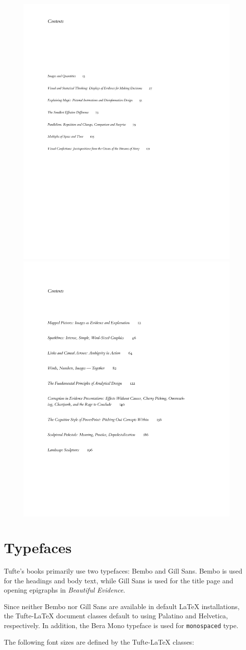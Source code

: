\documentclass[
  twoside,
  symmetric]{tufte-book}
\newcommand{\BE}{\textit{Beautiful Evidence}\xspace}
\newcommand{\TL}{Tufte-\LaTeX\xspace}
\begin{document}
\begin{figure}
\includegraphics[width=0.45\linewidth,height=\textheight,keepaspectratio]{style-guide/graphics/ve-contents.pdf}
\includegraphics[width=0.45\linewidth,height=\textheight,keepaspectratio]{style-guide/graphics/be-contents.pdf}

\end{figure}%

\section{Typefaces}\label{sec:typefaces1}

Tufte's books primarily use two typefaces: Bembo and Gill Sans. Bembo is
used for the headings and body text, while Gill Sans is used for the
title page and opening epigraphs in \BE.

Since neither Bembo nor Gill Sans are available in default LaTeX
installations, the \TL document classes default to using Palatino and
Helvetica, respectively. In addition, the Bera Mono typeface is used for
\texttt{monospaced} type.

The following font sizes are defined by the \TL classes:
\end{document}
